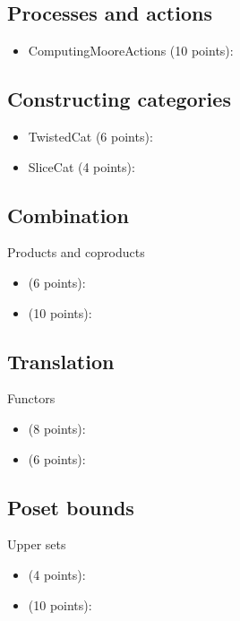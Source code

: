 \subsection{Processes and actions}
\begin{itemize}
    \item ComputingMooreActions (10 points): 
\end{itemize}

\subsection{Constructing categories}
\begin{itemize}
    \item TwistedCat (6 points): 
    \item SliceCat (4 points): 
\end{itemize}

\subsection{Combination}

Products and coproducts
\begin{itemize}
    \item {} (6 points): 
    \item {} (10 points): 
\end{itemize}

\subsection{Translation}

Functors
\begin{itemize}
    \item {} (8 points): 
    \item {} (6 points): 
\end{itemize}

\subsection{Poset bounds}
Upper sets
\begin{itemize}
    \item {} (4 points): 
    \item {} (10 points): 
\end{itemize}

